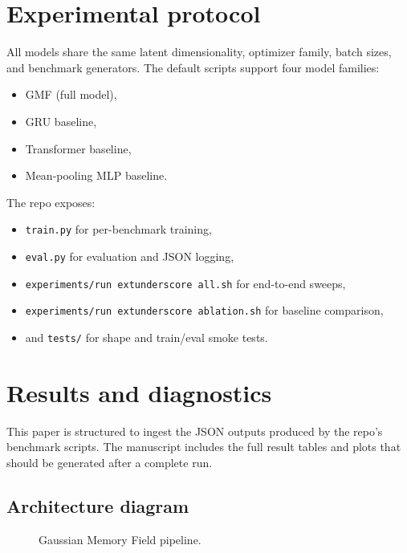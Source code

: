 \documentclass{article}
\begin{document}
\section{Experimental protocol}
All models share the same latent dimensionality, optimizer family, batch sizes, and benchmark generators. The default scripts support four model families:
\begin{itemize}[leftmargin=*]
\item GMF (full model),
\item GRU baseline,
\item Transformer baseline,
\item Mean-pooling MLP baseline.
\end{itemize}

The repo exposes:
\begin{itemize}[leftmargin=*]
\item \texttt{train.py} for per-benchmark training,
\item \texttt{eval.py} for evaluation and JSON logging,
\item \texttt{experiments/run	extunderscore all.sh} for end-to-end sweeps,
\item \texttt{experiments/run	extunderscore ablation.sh} for baseline comparison,
\item and \texttt{tests/} for shape and train/eval smoke tests.
\end{itemize}

\section{Results and diagnostics}
This paper is structured to ingest the JSON outputs produced by the repo's benchmark scripts. The manuscript includes the full result tables and plots that should be generated after a complete run.

\subsection{Architecture diagram}
\begin{figure}[H]
\centering
{}
\caption{Gaussian Memory Field pipeline.}
\end{figure}
\end{document}
